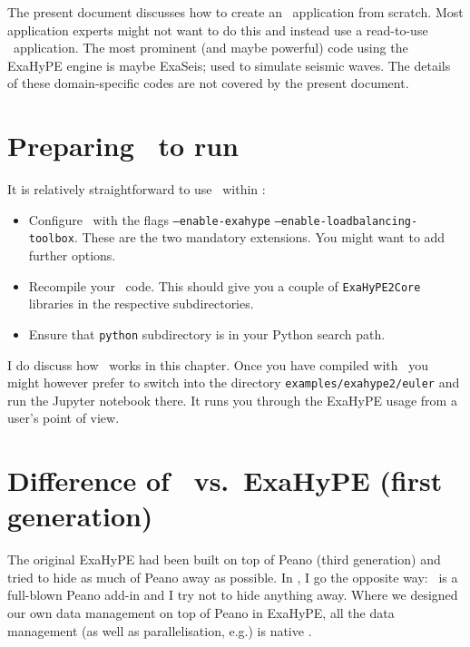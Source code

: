 The present document discusses how to create an \ExaHyPE\ application from
scratch.
Most application experts might not want to do this and instead use a read-to-use
\ExaHyPE\ application.
The most prominent (and maybe powerful) code using the ExaHyPE engine is maybe
ExaSeis; used to simulate seismic waves.
The details of these domain-specific codes are not covered by the present
document.



\section*{Preparing \Peano\ to run \ExaHyPE}

It is relatively straightforward to use \ExaHyPE\ within \Peano:

\begin{itemize}
  \item Configure \Peano\ with the flags \texttt{--enable-exahype}
  \texttt{--enable-loadbalancing-toolbox}. These are the two mandatory extensions. You might want to add further options.
  \item Recompile your \Peano\ code. This should give you a couple of
  \texttt{ExaHyPE2Core} libraries in the respective subdirectories.
  \item Ensure that \texttt{python} subdirectory is in your Python search path.
\end{itemize}


\begin{remark}
 I do discuss how \ExaHyPE\ works in this chapter. Once you have compiled with
 \ExaHyPE\ you might however prefer to switch into the directory
 \texttt{examples/exahype2/euler} and run the Jupyter notebook there.
 It runs you through the ExaHyPE usage from a user's point of view.
\end{remark}


\section*{Difference of \ExaHyPE\ vs.~ExaHyPE (first generation)}

The original ExaHyPE had been built on top of Peano (third generation) and tried
to hide as much of Peano away as possible.
In \ExaHyPE, I go the opposite way: \ExaHyPE\ is a full-blown Peano add-in and I
try not to hide anything away.
Where we designed our own data management on top of Peano in ExaHyPE, all the
data management (as well as parallelisation, e.g.) is native \Peano.


